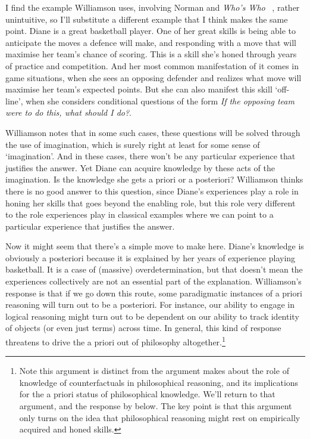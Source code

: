 I find the example Williamson uses, involving Norman and \emph{Who's Who} ~\citep[295]{Williamson2013}, rather unintuitive, so I'll substitute a different example that I think makes the same point. Diane is a great basketball player. One of her great skills is being able to anticipate the moves a defence will make, and responding with a move that will maximise her team's chance of scoring. This is a skill she's honed through years of practice and competition. And her most common manifestation of it comes in game situations, when she sees an opposing defender and realizes what move will maximise her team's expected points. But she can also manifest this skill `off-line', when she considers conditional questions of the form \emph{If the opposing team were to do this, what should I do?}.

Williamson notes that in some such cases, these questions will be solved through the use of imagination, which is surely right at least for some sense of `imagination'. And in these cases, there won't be any particular experience that justifies the answer. Yet Diane can acquire knowledge by these acts of the imagination. Is the knowledge she gets a priori or a posteriori? Williamson thinks there is no good answer to this question, since Diane's experiences play a role in honing her skills that goes beyond the enabling role, but this role very different to the role  experiences play in classical examples where we can point to a particular experience that justifies the answer.

Now it might seem that there's a simple move to make here. Diane's knowledge is obviously a posteriori because it is explained by her years of experience playing basketball. It is a case of (massive) overdetermination, but that doesn't mean the experiences collectively are not an essential part of the explanation. Williamson's response is that if we go down this route, some paradigmatic instances of a priori reasoning will turn out to be a posteriori. For instance, our ability to engage in logical reasoning might turn out to be dependent on our ability to track identity of objects (or even just terms) across time. In general, this kind of response threatens to drive the a priori out of philosophy altogether.\footnote{Note this argument is distinct from the argument  \citet{Williamson2007-WILTPO-17} makes about the role of knowledge of counterfactuals in philosophical reasoning, and its implications for the a priori status of philosophical knowledge. We'll return to that argument, and the response by  \citet{IchikawaJarvis2009} below. The key point is that this argument only turns on the idea that philosophical reasoning might rest on empirically acquired and honed skills.}

